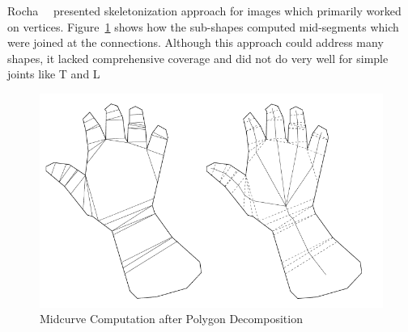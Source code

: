 
Rocha~\cite{Rocha98}~\cite{Rocha99} presented skeletonization approach for images which primarily worked on vertices. Figure~\ref{fig_rocha} shows how the sub-shapes computed mid-segments which were joined at the connections. Although this approach could address many shapes, it lacked comprehensive coverage and did not do very well for simple joints like T and L


\begin{figure}[h]
\centering \includegraphics[width=0.5\linewidth]{images/rocha} 
\caption{Midcurve Computation after Polygon Decomposition}
\label{fig_rocha}
\end{figure}

